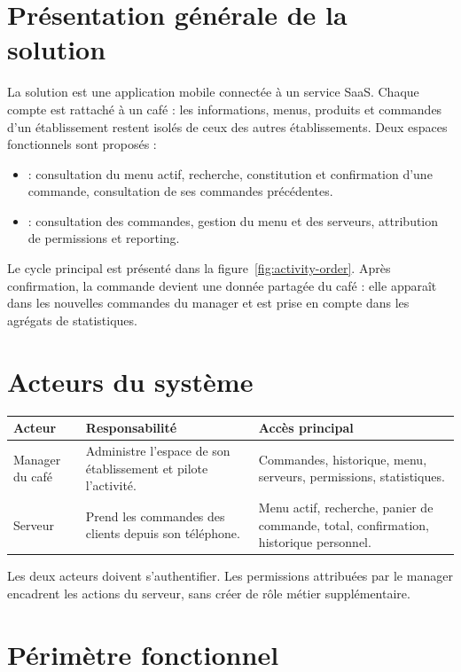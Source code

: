 \documentclass[11pt,a4paper]{article}
\newcommand{\pill}[1]{\tcbox[on line,boxsep=1.2pt,left=4pt,right=4pt,top=1pt,bottom=1pt,colback=dustyrose!70!softwhite,colframe=dustyrose,arc=3mm]{\sffamily\footnotesize #1}}
\begin{document}
\section{Présentation générale de la solution}
La solution est une application mobile connectée à un service SaaS. Chaque compte est rattaché à un café : les informations, menus, produits et commandes d’un établissement restent isolés de ceux des autres établissements. Deux espaces fonctionnels sont proposés :

\begin{itemize}
  \item \pill{Espace serveur} : consultation du menu actif, recherche, constitution et confirmation d’une commande, consultation de ses commandes précédentes.
  \item \pill{Espace manager} : consultation des commandes, gestion du menu et des serveurs, attribution de permissions et reporting.
\end{itemize}

Le cycle principal est présenté dans la figure~\ref{fig:activity-order}. Après confirmation, la commande devient une donnée partagée du café : elle apparaît dans les nouvelles commandes du manager et est prise en compte dans les agrégats de statistiques.

\section{Acteurs du système}
\begin{tabularx}{\textwidth}{P{0.2\textwidth}Y P{0.28\textwidth}}
\toprule
\textbf{Acteur} & \textbf{Responsabilité} & \textbf{Accès principal} \\
\midrule
Manager du café & Administre l’espace de son établissement et pilote l’activité. & Commandes, historique, menu, serveurs, permissions, statistiques. \\
Serveur & Prend les commandes des clients depuis son téléphone. & Menu actif, recherche, panier de commande, total, confirmation, historique personnel. \\
\bottomrule
\end{tabularx}

Les deux acteurs doivent s’authentifier. Les permissions attribuées par le manager encadrent les actions du serveur, sans créer de rôle métier supplémentaire.

\section{Périmètre fonctionnel}
\end{document}
